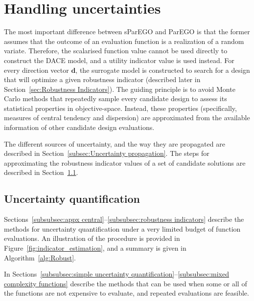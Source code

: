 \documentclass[10pt]{llncs}
\newcommand{\vd}{\ensuremath{\mathbf{d}}} %
\begin{document}
\section{Handling uncertainties}
\label{sec:Uncertainty Approximation}
The most important difference between sParEGO and ParEGO is that the former assumes that the outcome of an evaluation function is a realization of a random variate. Therefore, the scalarised function value cannot be used directly to construct the DACE model, and a utility indicator value is used instead. For every direction vector $\vd$, the surrogate model is constructed to search for a design that will optimize a given robustness indicator (described later in Section~\ref{sec:Robustness Indicators}). The guiding principle is to avoid Monte Carlo methods that repeatedly sample every candidate design to assess its statistical properties in objective-space. Instead, these properties (specifically, measures of central tendency and dispersion) are approximated from the available information of other candidate design evaluations.

The different sources of uncertainty, and the way they are propagated are described in Section~\ref{subsec:Uncertainty propagation}.
The steps for approximating the robustness indicator values of a set of candidate solutions are described in Section~\ref{subsec:Uncertainty quantification}. 

\subsection{Uncertainty quantification}
\label{subsec:Uncertainty quantification}
Sections~\ref{subsubsec:appx central}--\ref{subsubsec:robustness indicators} describe the methods for uncertainty quantification under a very limited budget of function evaluations. An illustration of the procedure is provided in Figure~\ref{fig:indicator_estimation}, and a summary is given in Algorithm~\ref{alg:Robust}.

In Sections~\ref{subsubsec:simple uncertainty quantification}--\ref{subsubsec:mixed complexity functions} describe the methods that can be used when some or all of the functions are not expensive to evaluate, and repeated evaluations are feasible.  
\end{document}
